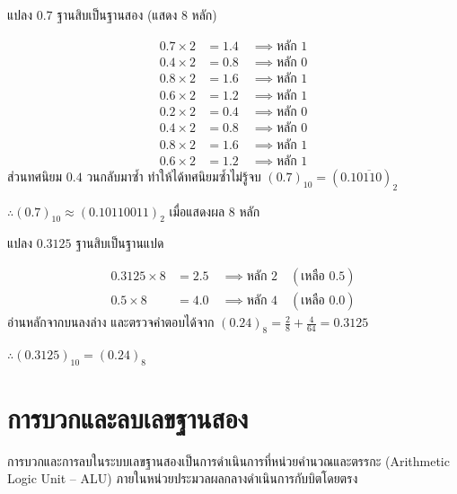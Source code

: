 \begin{ex}
\label{ex:frac-repeating}
แปลง $0.7$ ฐานสิบเป็นฐานสอง (แสดง 8 หลัก)
\end{ex}
\begin{solution}
\begin{align*}
0.7 \times 2 &= 1.4 \quad \implies \text{หลัก } 1\\
0.4 \times 2 &= 0.8 \quad \implies \text{หลัก } 0\\
0.8 \times 2 &= 1.6 \quad \implies \text{หลัก } 1\\
0.6 \times 2 &= 1.2 \quad \implies \text{หลัก } 1\\
0.2 \times 2 &= 0.4 \quad \implies \text{หลัก } 0\\
0.4 \times 2 &= 0.8 \quad \implies \text{หลัก } 0\\
0.8 \times 2 &= 1.6 \quad \implies \text{หลัก } 1\\
0.6 \times 2 &= 1.2 \quad \implies \text{หลัก } 1
\end{align*}
ส่วนทศนิยม $0.4$ วนกลับมาซ้ำ ทำให้ได้ทศนิยมซ้ำไม่รู้จบ $(0.7)_{10} = (0.1\overline{0110})_2$

$\therefore (0.7)_{10} \approx (0.10110011)_2$ เมื่อแสดงผล 8 หลัก \solhere
\end{solution}

\begin{ex}
\label{ex:frac-to-oct}
แปลง $0.3125$ ฐานสิบเป็นฐานแปด
\end{ex}
\begin{solution}
\begin{align*}
0.3125 \times 8 &= 2.5 \quad \implies \text{หลัก } 2 \quad (\text{เหลือ } 0.5)\\
0.5    \times 8 &= 4.0 \quad \implies \text{หลัก } 4 \quad (\text{เหลือ } 0.0)
\end{align*}
อ่านหลักจากบนลงล่าง และตรวจคำตอบได้จาก $(0.24)_8 = \frac{2}{8} + \frac{4}{64} = 0.3125$

$\therefore (0.3125)_{10} = (0.24)_8$ \solhere
\end{solution}

\section{การบวกและลบเลขฐานสอง}
\label{sec:binary-add-sub}

การบวกและการลบในระบบเลขฐานสองเป็นการดำเนินการที่หน่วยคำนวณและตรรกะ (Arithmetic Logic Unit -- ALU) ภายในหน่วยประมวลผลกลางดำเนินการกับบิตโดยตรง~\parencite{kolman2008discrete}

